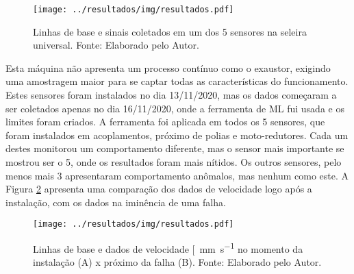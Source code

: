 \documentclass[a4paper]{ifacconf}
\begin{document}
\begin{figure}[h!]
  \begin{center}
      \texttt{[image: ../resultados/img/resultados.pdf]}
  \end{center}
  \caption{Linhas de base e sinais coletados em um dos 5 sensores na seleira universal. Fonte: Elaborado pelo Autor.}
  \label{fig:seleira_universal}
\end{figure}

Esta máquina não apresenta um processo contínuo como o exaustor, exigindo uma amostragem maior para se captar todas as características do 
funcionamento. Estes sensores foram instalados no dia 13/11/2020, mas os dados começaram a ser coletados apenas no dia 16/11/2020, onde a 
ferramenta de ML fui usada e os limites foram criados. 
A ferramenta foi aplicada em todos os 5 sensores, que foram instalados em acoplamentos, próximo de polias e moto-redutores.
Cada um destes monitorou um comportamento diferente, mas o sensor mais importante se mostrou ser o 5, onde os resultados foram mais nítidos. 
Os outros sensores, pelo menos mais 3 apresentaram comportamento anômalos, mas nenhum como este. A Figura \ref{fig:seleira_universal_antes_depois}
apresenta uma comparação dos dados de velocidade logo após a instalação, com os dados na iminência de uma falha.


\begin{figure}[h!]
  \begin{center}
      \texttt{[image: ../resultados/img/resultados.pdf]}
  \end{center}
  \caption{Linhas de base e dados de velocidade [\SI{}{\milli\metre\per\second} no momento da instalação
  (A) x próximo da falha (B). Fonte: Elaborado pelo Autor.}
  \label{fig:seleira_universal_antes_depois}
\end{figure}
\end{document}
